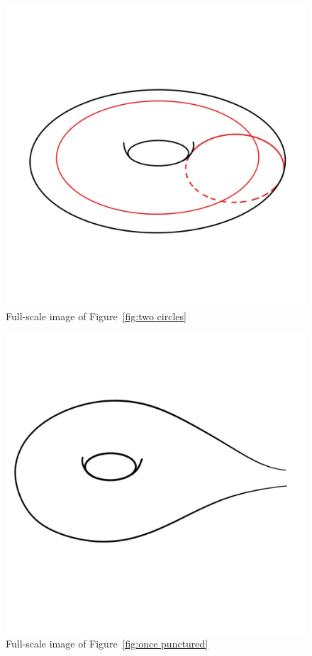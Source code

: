 \documentclass[12pt,a4paper,reqno,parskip=full]{amsart}
\numberwithin{equation}{section}
\theoremstyle{plain}
\theoremstyle{definition}
\begin{document}
\begin{figure}[H]
    \centering
    \includegraphics[width=\textwidth]{images/torus with curves.jpg}
    \caption{Full-scale image of Figure~\ref{fig:two circles}}
\end{figure}

\begin{figure}[H]
    \centering
    \includegraphics[width=\textwidth]{images/punctured torus.jpg}
    \caption{Full-scale image of Figure~\ref{fig:once punctured}}
\end{figure}
\end{document}
